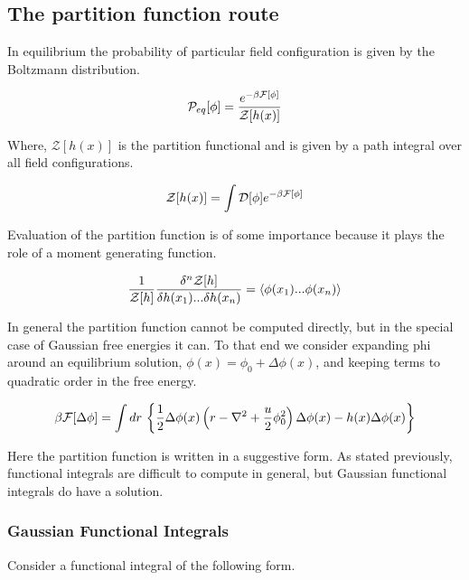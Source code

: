 \subsection{The partition function route}

In equilibrium the probability of particular field configuration is given by the Boltzmann distribution.

\begin{equation}
\mathcal{P}_{eq}[\phi] = \frac{e^{-\beta\mathcal{F}[\phi]}}{\mathcal{Z}[h(x)]}
\end{equation}

Where, $\mathcal{Z}[h(x)]$ is the partition functional and is given by a path integral over all field configurations.

\begin{equation}
\mathcal{Z}[h(x)] = \int \mathcal{D}[\phi] e^{-\beta\mathcal{F}[\phi]}
\end{equation}

Evaluation of the partition function is of some importance because it plays the role of a moment generating function.

\begin{equation}\label{gen}
\frac{1}{\mathcal{Z}[h]}\frac{\delta^n \mathcal{Z}[h]}{\delta h(x_1)...\delta h(x_n)} = \langle \phi(x_1)...\phi(x_n)\rangle
\end{equation}

In general the partition function cannot be computed directly, but in the special case of Gaussian free energies it can. To that end we consider expanding phi around an equilibrium solution, $\phi(x) = \phi_0 + \Delta\phi(x)$, and keeping terms to quadratic order in the free energy.

\begin{equation}
\beta\mathcal{F}[\Delta\phi] = \int dr \,\left\lbrace \frac{1}{2}\Delta\phi(x) \left(r - \nabla^2 + \frac{u}{2}\phi_0^2\right) \Delta\phi(x) - h(x)\Delta\phi(x) \right\rbrace
\end{equation}

Here the partition function is written in a suggestive form. As stated previously, functional integrals are difficult to compute in general, but Gaussian functional integrals do have a solution.

\subsubsection{Gaussian Functional Integrals}

Consider a functional integral of the following form.

